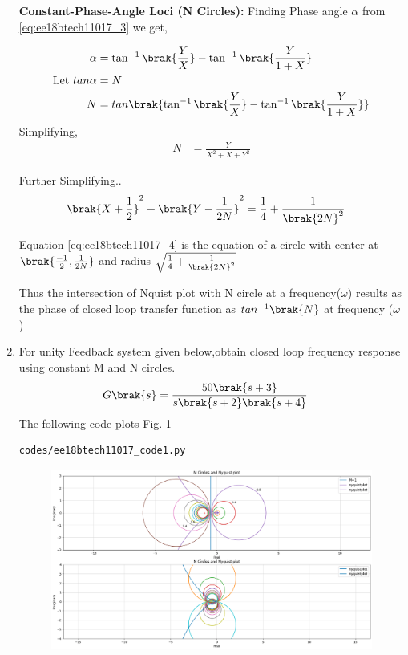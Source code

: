 \begin{enumerate}[label=\thesection.\arabic*.,ref=\thesection.\theenumi]
\textbf{Constant-Phase-Angle Loci (N Circles):}
Finding Phase angle $\alpha$ from \eqref{eq:ee18btech11017_3} we get,

\begin{align}
\alpha &= \tan^{-1}\brak{\frac{Y}{X}}-\tan^{-1}\brak{\frac{Y}{1+X}}
\\
\text{Let } tan\alpha &= N
\\
N &= tan\brak{\tan^{-1}\brak{\frac{Y}{X}}-\tan^{-1}\brak{\frac{Y}{1+X}}}
\end{align}
Simplifying,
\begin{align}
N &= \frac{Y}{X^{2}+X+Y^{2}}
\end{align}

Further Simplifying..
\begin{align}
\brak{X+\frac{1}{2}}^{2}+\brak{Y-\frac{1}{2N}}^{2} &= \frac{1}{4}+\frac{1}{\brak{2N}^{2}}
\label{eq:ee18btech11017_4}
\end{align}

Equation \eqref{eq:ee18btech11017_4} is the equation of a circle with center at $\brak{\frac{-1}{2},\frac{1}{2N}}$ and radius $\sqrt{\frac{1}{4}+\frac{1}{\brak{2N}^{2}}}$


Thus the intersection of Nquist plot with N circle at a frequency($\omega$) results as the phase of closed loop transfer function as $tan^{-1}\brak{N}$ at frequency ($\omega$)


\item
For unity Feedback system given below,obtain closed loop frequency response using constant M and N circles.
\begin{align}
G\brak{s} &=\frac{50\brak{s+3}}{s\brak{s+2}\brak{s+4}}
\end{align}
\solution 
The following code plots Fig. \ref{fig:ee18btech11017_fig1}
\begin{lstlisting}
codes/ee18btech11017_code1.py
\end{lstlisting}


\begin{figure}[!h]
  \includegraphics[width=\columnwidth]{./figs/ee18btech11017_fig1.eps}
 \caption{}
  \label{fig:ee18btech11017_fig1}
\end{figure}


\end{enumerate}
